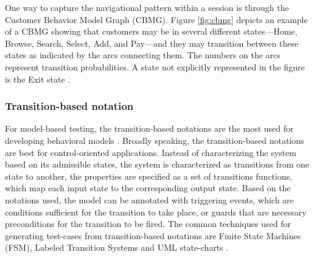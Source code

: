 \documentclass[espaco=umemeio,chapter=TITLE,twoside,openright]{abnt}
\begin{document}
One way to capture the navigational pattern within a session is through the Customer Behavior Model Graph (CBMG). Figure \ref{fig:cbmg} depicts an example of a CBMG showing that customers may be in several different states—Home, Browse, Search, Select, Add, and Pay—and they may transition between these states as indicated by the arcs connecting them. The numbers on the arcs represent transition probabilities. A state not explicitly represented in the figure is the Exit state \cite{Menasce2002a} \cite{Jiang2010} \cite{MohammadS.Obaidat}.



\subsubsection{Transition-based notation}


For model-based testing, the transition-based notations are the most used for developing behavioral models \cite{utting2010practical}. Broadly speaking, the
transition-based notations are best for control-oriented applications. Instead of characterizing the system based on its admissible states, the system is characterized as transitions from one state to another, the properties are specified as a set of transitions functions, which
map each input state to the corresponding output state. Based on the notations
used, the model can be annotated with triggering events, which are
conditions sufficient for the transition to take place, or guards that are necessary
preconditions for the transition to be fired. The common techniques used for generating test-cases from transition-based notations are Finite State Machines (FSM), Labeled Transition Systems and UML state-charts \cite{Marinescu2015}.
\end{document}
